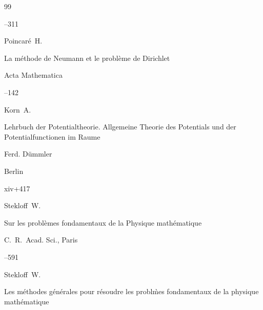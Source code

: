 \begin{thebibliography}{99}


–311





\by Poincar\'e~H.

\paper La m\'ethode de Neumann et le probl\`eme de Dirichlet

\jour Acta Mathematica




--142







\by Korn~A.

\book Lehrbuch der Potentialtheorie. Allgemeine Theorie des Potentials und der Potentialfunctionen im Raume


\publ Ferd. D\"ummler

\publaddr Berlin

\totalpages xiv+417





\by Stekloff~W.

\paper Sur les probl\`emes fondamentaux de la Physique math\'ematique

\jour C.~R.~Acad. Sci.\rm, Paris



--591





\by Stekloff~W.

\paper Les m\'ethodes g\'en\'erales pour r\'esoudre les probl\`mes fondamentaux de la physique math\'ematique


\end{thebibliography}
